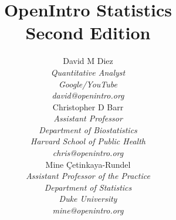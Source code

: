 
\title{\huge OpenIntro Statistics\vspace{1.5mm} \\ \Large Second Edition}
\author{David M Diez \\
\small\emph{Quantitative Analyst} \\
\small\emph{Google/YouTube} \\
\vspace{6mm}%
\small\emph{david@openintro.org} \\
Christopher D Barr \\
\small\emph{Assistant Professor} \\
\small\emph{Department of Biostatistics} \\
\small\emph{Harvard School of Public Health} \\
\vspace{6mm}%
\small\emph{chris@openintro.org} \\
Mine \c{C}etinkaya-Rundel \\
\small\emph{Assistant Professor of the Practice} \\
\small\emph{Department of Statistics} \\
\small\emph{Duke University} \\
\small\emph{mine@openintro.org}}
